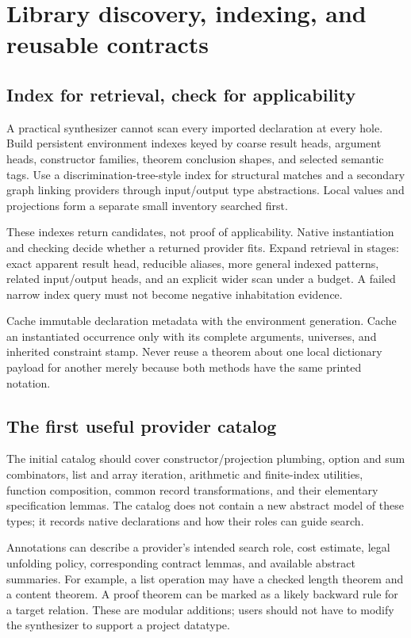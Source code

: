 \section{Library discovery, indexing, and reusable contracts}
\label{sec:library}
\subsection{Index for retrieval, check for applicability}
A practical synthesizer cannot scan every imported declaration at every hole. Build persistent environment indexes keyed by coarse result heads, argument heads, constructor families, theorem conclusion shapes, and selected semantic tags. Use a discrimination-tree-style index for structural matches and a secondary graph linking providers through input/output type abstractions. Local values and projections form a separate small inventory searched first.

These indexes return candidates, not proof of applicability. Native instantiation and checking decide whether a returned provider fits. Expand retrieval in stages: exact apparent result head, reducible aliases, more general indexed patterns, related input/output heads, and an explicit wider scan under a budget. A failed narrow index query must not become negative inhabitation evidence.

Cache immutable declaration metadata with the environment generation. Cache an instantiated occurrence only with its complete arguments, universes, and inherited constraint stamp. Never reuse a theorem about one local dictionary payload for another merely because both methods have the same printed notation.

\subsection{The first useful provider catalog}
The initial catalog should cover constructor/projection plumbing, option and sum combinators, list and array iteration, arithmetic and finite-index utilities, function composition, common record transformations, and their elementary specification lemmas. The catalog does not contain a new abstract model of these types; it records native declarations and how their roles can guide search.

Annotations can describe a provider's intended search role, cost estimate, legal unfolding policy, corresponding contract lemmas, and available abstract summaries. For example, a list operation may have a checked length theorem and a content theorem. A proof theorem can be marked as a likely backward rule for a target relation. These are modular additions; users should not have to modify the synthesizer to support a project datatype.

